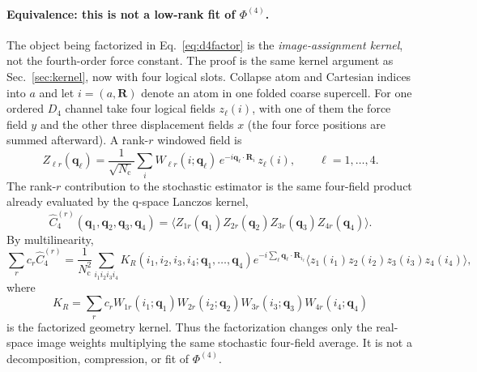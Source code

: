 \documentclass[11pt,a4paper]{article}
\newcommand{\qv}{\mathbf{q}}
\newcommand{\Rv}{\mathbf{R}}
\newcommand{\Nc}{N_{\mathrm{c}}}
\begin{document}
\paragraph{Equivalence: this is not a low-rank fit of $\Phi^{(4)}$.}
The object being factorized in Eq.~\eqref{eq:d4factor} is the
\emph{image-assignment kernel}, not the fourth-order force constant.  The
proof is the same kernel argument as Sec.~\ref{sec:kernel}, now with four
logical slots.  Collapse atom and Cartesian indices into $a$ and let
$i=(a,\Rv)$ denote an atom in one folded coarse supercell.  For one ordered
$D_4$ channel take four logical fields $z_\ell(i)$, with one of them the
force field $y$ and the other three displacement fields $x$ (the four force
positions are summed afterward).  A rank-$r$ windowed field is
\begin{equation}
Z_{\ell r}(\qv_\ell)
 = \frac{1}{\sqrt{\Nc}}\sum_i
 W_{\ell r}(i;\qv_\ell)\,
 e^{-i\qv_\ell\cdot \Rv_i}\,z_\ell(i),
\qquad \ell=1,\ldots,4 .
\label{eq:d4windowfield}
\end{equation}
The rank-$r$ contribution to the stochastic estimator is the same four-field
product already evaluated by the q-space Lanczos kernel,
\begin{equation}
\widehat C^{(r)}_4(\qv_1,\qv_2,\qv_3,\qv_4)
 = \bigl\langle
 Z_{1r}(\qv_1)Z_{2r}(\qv_2)Z_{3r}(\qv_3)Z_{4r}(\qv_4)
 \bigr\rangle .
\end{equation}
By multilinearity,
\begin{equation}
\sum_r c_r \widehat C^{(r)}_4
=\frac{1}{\Nc^2}\sum_{i_1i_2i_3i_4}
K_R(i_1,i_2,i_3,i_4;\qv_1,\ldots,\qv_4)
e^{-i\sum_\ell \qv_\ell\cdot\Rv_{i_\ell}}
\bigl\langle z_1(i_1)z_2(i_2)z_3(i_3)z_4(i_4)\bigr\rangle ,
\label{eq:d4kernelaverage}
\end{equation}
where
\begin{equation}
K_R=\sum_r c_r
W_{1r}(i_1;\qv_1)W_{2r}(i_2;\qv_2)
W_{3r}(i_3;\qv_3)W_{4r}(i_4;\qv_4)
\end{equation}
is the factorized geometry kernel.  Thus the factorization changes only the
real-space image weights multiplying the same stochastic four-field
average.  It is not a decomposition, compression, or fit of
$\Phi^{(4)}$.
\end{document}
